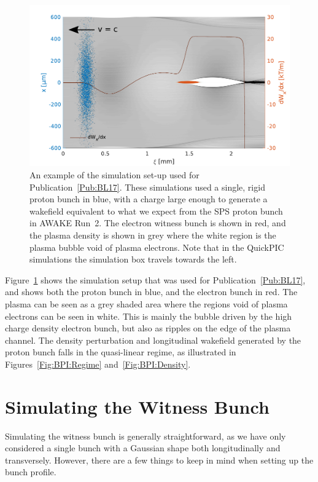 \begin{figure}[hbt]
    \centering
    \includegraphics[width=0.8125\linewidth,trim={0mm 0mm 0mm 0mm},clip]{figures/SingleBunchPB}
    \caption{\label{Fig:PBSingle}
        An example of the simulation set-up used for Publication~\ref{Pub:BL17}.
        These simulations used a single, rigid proton bunch in blue, with a charge large enough to generate a wakefield equivalent to what we expect from the SPS proton bunch in AWAKE Run~2.
        The electron witness bunch is shown in red, and the plasma density is shown in grey where the white region is the plasma bubble void of plasma electrons.
        Note that in the QuickPIC simulations the simulation box travels towards the left.
    }
\end{figure}

Figure~\ref{Fig:PBSingle} shows the simulation setup that was used for Publication~\ref{Pub:BL17}, and shows both the proton bunch in blue, and the electron bunch in red.
The plasma can be seen as a grey shaded area where the regions void of plasma electrons can be seen in white.
This is mainly the bubble driven by the high charge density electron bunch, but also as ripples on the edge of the plasma channel.
The density perturbation and longitudinal wakefield generated by the proton bunch falls in the quasi-linear regime, as illustrated in Figures~\ref{Fig:BPI:Regime} and~\ref{Fig:BPI:Density}.

\section{Simulating the Witness Bunch}
\label{Sim:EBeam}

Simulating the witness bunch is generally straightforward, as we have only considered a single bunch with a Gaussian shape both longitudinally and transversely.
However, there are a few things to keep in mind when setting up the bunch profile.

